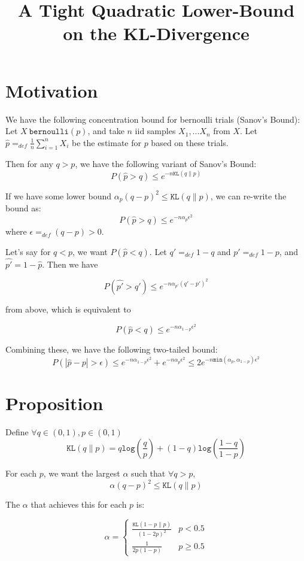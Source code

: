 \documentclass{article}
\newcommand{\kl}[2] { \texttt{KL}(#1 \| #2) }
\newcommand{\logfrac}[2] { \texttt{log}\left(\frac{#1}{#2}\right)  }
\begin{document}
\title{A Tight Quadratic Lower-Bound on the KL-Divergence}
\maketitle

\section{Motivation}
We have the following concentration bound for bernoulli trials (Sanov's Bound):
Let $X ~ \texttt{bernoulli}(p)$, and take $n$ iid samples $X_1,...X_n$ from $X$.  
Let $\hat{p} =_{def} \frac{1}{n}\sum_{i=1}^n{X_i}$ be the estimate for $p$ based on these trials.  

Then for any $q > p$, we have the following variant of Sanov's Bound:
$$P(\hat{p} > q) \leq e^{- n \kl{q}{p}}$$

If we have some lower bound $ \alpha_p (q-p)^2 \leq \kl{q}{p} $, we can 
re-write the bound as:
$$P(\hat{p} > q) \leq e^{- n \alpha_p \epsilon^2}$$
where $\epsilon =_{def} (q-p) > 0$.

Let's say for $q < p$, we want $P(\hat{p} < q)$.  Let $q' =_{def} 1-q$ and 
$p' =_{def} 1 - p$, and $\hat{p'} = 1 - \hat{p}$.  Then we have 

$$P(\hat{p'} > q') \leq e^{- n \alpha_{p'} (q' - p')^2}$$

from above, which is equivalent to 

$$P(\hat{p} < q) \leq e^{- n \alpha_{1-p} \epsilon^2}$$

Combining these, we have the following two-tailed bound:
\[
P(|\hat{p} - p| > \epsilon) \leq e^{- n \alpha_{1-p} \epsilon^2} + 
e^{- n \alpha_{p} \epsilon^2} 
\leq 
2 e^{- n \texttt{min}(\alpha_{p},\alpha_{1-p}) \epsilon^2} 
\]

\section{Proposition}
Define $\forall q\in(0,1), p\in(0,1)$
$$\kl{q}{p} = q \logfrac{q}{p} + (1-q) \logfrac{1-q}{1-p}$$

For each $p$, we want the largest $\alpha$ such that $\forall q > p$, 
$$ \alpha (q-p)^2 \leq \kl{q}{p} $$

The $\alpha$ that achieves this for each $p$ is:

\[
\alpha = 
\begin{cases}
    \frac{  \kl{1-p}{p}  }{  (1-2p)^2  } & p < 0.5 \\
     \frac{1}{  2p(1-p)  }                & p \geq 0.5
\end{cases}
\]
\end{document}
